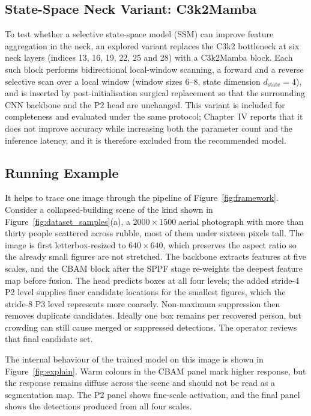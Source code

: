\subsection{State-Space Neck Variant: C3k2Mamba}
\label{sec:mamba}
To test whether a selective state-space model (SSM) can improve feature
aggregation in the neck, an explored variant replaces the C3k2 bottleneck at six
neck layers (indices 13, 16, 19, 22, 25 and 28) with a C3k2Mamba block. Each such
block performs bidirectional local-window scanning, a forward and a reverse
selective scan over a local window (window sizes 6--8, state dimension
$d_{\text{state}} = 4$), and is inserted by post-initialisation surgical
replacement so that the surrounding CNN backbone and the P2 head are unchanged.
This variant is included for completeness and evaluated under the same protocol;
Chapter~IV reports that it does not improve accuracy while increasing both the
parameter count and the inference latency, and it is therefore excluded from the
recommended model.

\subsection{Running Example}
It helps to trace one image through the pipeline of Figure~\ref{fig:framework}.
Consider a collapsed-building scene of the kind shown in
Figure~\ref{fig:dataset_samples}(a), a $2000\times1500$ aerial photograph with more
than thirty people scattered across rubble, most of them under sixteen pixels tall.
The image is first letterbox-resized to $640\times640$, which preserves the aspect
ratio so the already small figures are not stretched. The backbone extracts
features at five scales, and the CBAM block after the SPPF stage re-weights the
deepest feature map before fusion. The head predicts boxes at all four levels;
the added stride-4 P2 level supplies finer candidate locations for the smallest
figures, which the stride-8 P3 level represents more coarsely. Non-maximum
suppression then removes duplicate candidates. Ideally one box remains per
recovered person, but crowding can still cause merged or suppressed detections.
The operator reviews that final candidate set.

The internal behaviour of the trained model on this image is shown in
Figure~\ref{fig:explain}. Warm colours in the CBAM panel mark higher response,
but the response remains diffuse across the scene and should not be read as a
segmentation map. The P2 panel shows fine-scale activation, and the final panel
shows the detections produced from all four scales.

